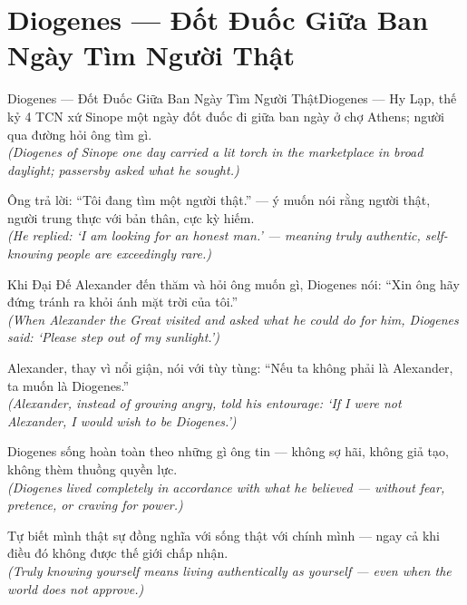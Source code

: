 \section{Diogenes --- Đốt Đuốc Giữa Ban Ngày Tìm Người Thật}
\begin{truyen}{Diogenes --- Đốt Đuốc Giữa Ban Ngày Tìm Người Thật}{Diogenes --- Hy Lạp, thế kỷ 4 TCN}
 xứ Sinope một ngày đốt đuốc đi giữa ban ngày ở chợ Athens; người qua đường hỏi ông tìm gì.\\[4pt]
\textit{(Diogenes of Sinope one day carried a lit torch in the marketplace in broad daylight; passersby asked what he sought.)}

Ông trả lời: ``Tôi đang tìm một người thật.'' --- ý muốn nói rằng người thật, người trung thực với bản thân, cực kỳ hiếm.\\[4pt]
\textit{(He replied: `I am looking for an honest man.' --- meaning truly authentic, self-knowing people are exceedingly rare.)}

Khi Đại Đế Alexander đến thăm và hỏi ông muốn gì, Diogenes nói: ``Xin ông hãy đứng tránh ra khỏi ánh mặt trời của tôi.''\\[4pt]
\textit{(When Alexander the Great visited and asked what he could do for him, Diogenes said: `Please step out of my sunlight.')}

Alexander, thay vì nổi giận, nói với tùy tùng: ``Nếu ta không phải là Alexander, ta muốn là Diogenes.''\\[4pt]
\textit{(Alexander, instead of growing angry, told his entourage: `If I were not Alexander, I would wish to be Diogenes.')}

Diogenes sống hoàn toàn theo những gì ông tin --- không sợ hãi, không giả tạo, không thèm thuồng quyền lực.\\[4pt]
\textit{(Diogenes lived completely in accordance with what he believed --- without fear, pretence, or craving for power.)}

\end{truyen}
\begin{baihoc}
  Tự biết mình thật sự đồng nghĩa với sống thật với chính mình --- ngay cả khi điều đó không được thế giới chấp nhận.\\[4pt]
  \textit{(Truly knowing yourself means living authentically as yourself --- even when the world does not approve.)}
\end{baihoc}

